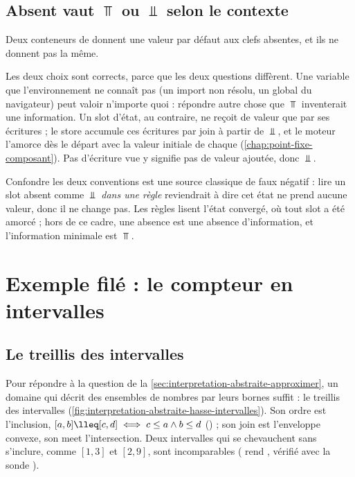\subsection{\og Absent\fg{} vaut $\Top$ ou $\Bot$ selon le contexte}

Deux conteneurs de \reactant{} donnent une valeur par défaut aux clefs
absentes, et ils ne donnent pas la même.



Les deux choix sont corrects, parce que les deux questions diffèrent. Une
variable que l'environnement ne connaît pas (un import non résolu, un global
du navigateur) peut valoir n'importe quoi : répondre autre chose que $\Top$
inventerait une information. Un slot d'état, au contraire, ne reçoit de valeur
que par ses écritures ; le store accumule ces écritures par join à partir de
$\Bot$, et le moteur l'amorce dès le départ avec la valeur initiale de chaque
 (\cref{chap:point-fixe-composant}). \og Pas d'écriture
vue\fg{} y signifie \og pas de valeur ajoutée\fg{}, donc $\Bot$.

\begin{piege}
  Confondre les deux conventions est une source classique de faux négatif :
  lire un slot absent comme $\Bot$ \emph{dans une règle} reviendrait à dire
  \og cet état ne prend aucune valeur\fg{}, donc \og il ne change pas\fg{}. Les
  règles lisent l'état convergé, où tout slot a été amorcé ; hors de ce cadre,
  une absence est une absence d'information, et l'information minimale est
  $\Top$.
\end{piege}

\section{Exemple filé : le compteur en intervalles}
\label{sec:interpretation-abstraite-compteur}

\subsection{Le treillis des intervalles}

Pour répondre à la question de la
\cref{sec:interpretation-abstraite-approximer}, un domaine qui décrit des
ensembles de nombres par leurs bornes suffit : le treillis des intervalles
(\cref{fig:interpretation-abstraite-hasse-intervalles}). Son ordre est
l'inclusion, $[a,b] \lleq [c,d] \iff c \le a \wedge b \le d$
() ; son join est l'enveloppe
convexe, son meet l'intersection. Deux intervalles qui se chevauchent sans
s'inclure, comme $[1,3]$ et $[2,9]$, sont incomparables (
rend , vérifié avec la sonde ).

